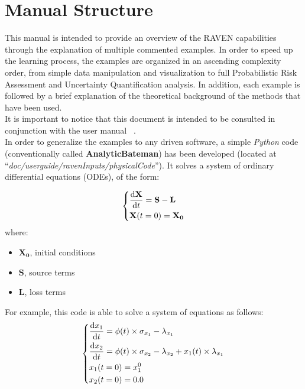 \section{Manual Structure}
This manual is intended to provide an overview of the RAVEN capabilities through the explanation of multiple commented examples. 
In order to speed up the learning process, the examples are organized in an ascending complexity order, from simple data manipulation and visualization to
full Probabilistic Risk Assessment and Uncertainty Quantification analysis. In addition, each example is followed by a brief explanation of the theoretical background of the methods that have been used.
\\ It is important to notice that this document is intended to be consulted in conjunction with the user manual ~\cite{RAVENuserManual}.
\\ In order to generalize the examples to any driven software, a simple \textit{Python} code (conventionally called \textbf{AnalyticBateman}) has been developed (located at ``\textit{doc/user\textunderscore guide/ravenInputs/physicalCode}''). It solves a system of ordinary differential equations (ODEs), of the form:

\begin{equation}
\begin{dcases}
\frac{\mathrm{d} \mathbf{X}}{\mathrm{d} t} = \mathbf{S}-\mathbf{L} \\
 \mathbf{X}(t=0)= \mathbf{X_{0}}
\end{dcases}
\end{equation}
   where: 
  \begin{itemize}
     \item $\mathbf{X_{0}}$, initial conditions \\     
     \item $\mathbf{S}$, source terms \\
     \item $\mathbf{L}$, loss terms
   \end{itemize}  

For example, this  code is able to solve a system of equations as follows:
\begin{equation}
  \begin{dcases}
   \frac{\mathrm{d} x_{1}}{\mathrm{d} t} = \phi (t)\times \sigma_{x_{1}}-\lambda_{x_{1}} \\
   \frac{\mathrm{d} x_{2}}{\mathrm{d} t} = \phi (t)\times \sigma_{x_{2}}-\lambda_{x_{2}}+x_{1}(t)\times\lambda_{x_{1}} \\
    x_{1}(t=0)= x_{1}^{0} \\
    x_{2}(t=0)= 0.0
  \end{dcases}
\end{equation}

